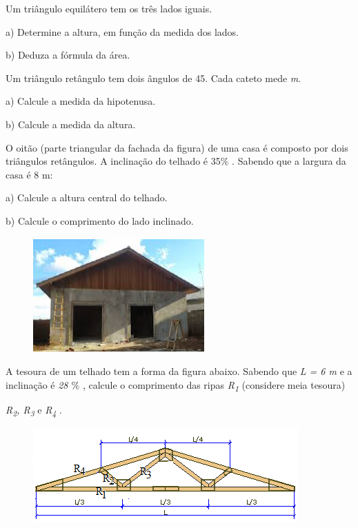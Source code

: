 \begin{exercicios}
\exitem{} Um triângulo equilátero tem os três lados iguais.

a) Determine a altura, em função da medida dos lados.

b) Deduza a fórmula da área.

\exitem{} Um triângulo retângulo tem dois ângulos de 45\degree. Cada cateto mede \textit{m}.

a) Calcule a medida da hipotenusa.

b) Calcule a medida da altura.

\exitem{} O oitão (parte triangular da fachada da figura) de uma casa é composto por dois triângulos retângulos. A inclinação do telhado é 35$\%$ . Sabendo que a largura da casa é 8 m:

a) Calcule a altura central do telhado.

b) Calcule o comprimento do lado inclinado.

\begin{figure}[H]
    \begin{Center}
        \includegraphics[width=2.58in,height=1.73in]{capitulos/trigonometria_e_funcoes_trigonometricas/media/image16.png}
    \end{Center}
\end{figure}

\exitem{} A tesoura de um telhado tem a forma da figura abaixo. Sabendo que \textit{L = 6 m} e a inclinação é \textit{28 $\%$ }, calcule o comprimento das ripas \textit{R\textsubscript{1} }(considere meia tesoura)  

\textit{ R\textsubscript{2}, R\textsubscript{3} }e\textit{ R\textsubscript{4}} . 

\begin{figure}[H]
    \begin{Center}
        \includegraphics[width=4.0in,height=1.43in]{capitulos/trigonometria_e_funcoes_trigonometricas/media/image17.png}
    \end{Center}
\end{figure}


\end{exercicios}
